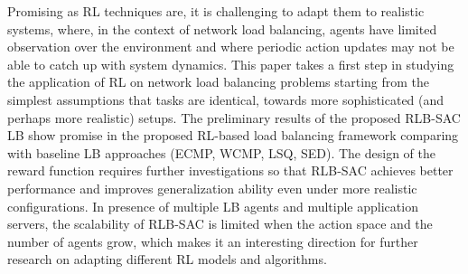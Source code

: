 \documentclass{article}
\begin{document}
Promising as RL techniques are, it is challenging to adapt them to realistic systems, where, in the context of network load balancing, agents have limited observation over the environment and where periodic action updates may not be able to catch up with system dynamics.
This paper takes a first step in studying the application of RL on network load balancing problems starting from the simplest assumptions that tasks are identical, towards more sophisticated (and perhaps more realistic) setups.
The preliminary results of the proposed RLB-SAC LB show promise in the proposed RL-based load balancing framework comparing with baseline LB approaches (ECMP, WCMP, LSQ, SED).
The design of the reward function requires further investigations so that RLB-SAC achieves better performance and improves generalization ability even under more realistic configurations.
In presence of multiple LB agents and multiple application servers, the scalability of RLB-SAC is limited when the action space and the number of agents grow, which makes it an interesting direction for further research on adapting different RL models and algorithms.







\end{document}
